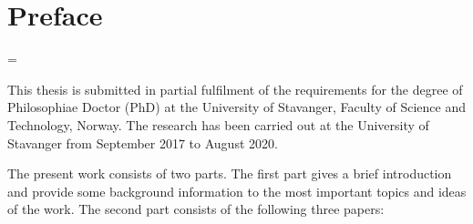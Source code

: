 \chapter*{Preface}

\emergencystretch=\maxdimen
{}

This thesis is submitted in partial fulfilment of the requirements for the degree of Philosophiae Doctor (PhD) at the University of Stavanger, Faculty of Science and Technology, Norway. The research has been carried out at the University of Stavanger from September 2017 to August 2020.

The present work consists of two parts. The first part gives a brief introduction and provide some background information to the most important topics and ideas of the work. The second part consists of the following three papers:




